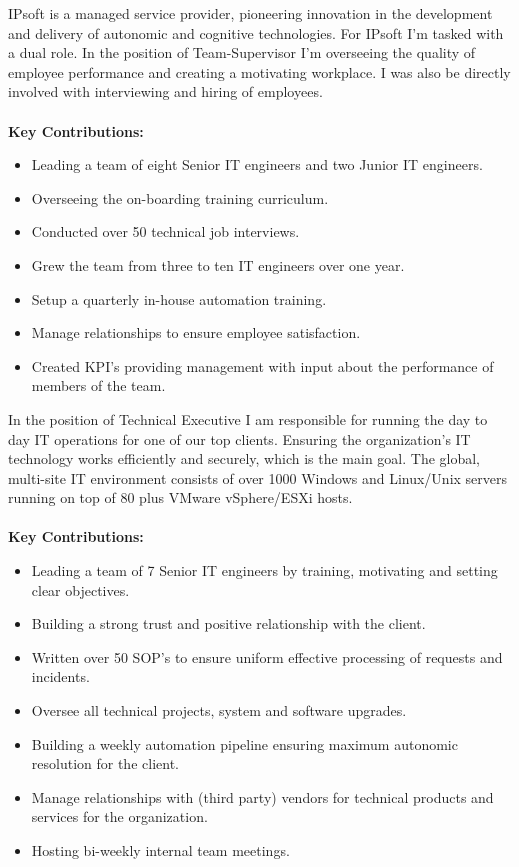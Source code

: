 \vspace{2pt}
IPsoft is a managed service provider, pioneering innovation in the development and delivery of autonomic and cognitive technologies. For IPsoft I'm tasked with a dual role. In the position of Team-Supervisor I'm overseeing the quality of employee performance and creating a motivating workplace. I was also be directly involved with interviewing and hiring of employees.\\
\\
\textbf{Key Contributions:}
\begin{itemize}
\item Leading a team of eight Senior IT engineers and two Junior IT engineers.
\item Overseeing the on-boarding training curriculum. 
\item Conducted over 50 technical job interviews.
\item Grew the team from three to ten IT engineers over one year.
\item Setup a quarterly in-house automation training. 
\item Manage relationships to ensure employee satisfaction.
\item Created KPI's providing management with input about the performance of members of the team. \\
\end{itemize}
In the position of Technical Executive I am responsible for running the day to day IT operations for one of our top clients. Ensuring the organization’s IT technology works efficiently and securely, which is the main goal. The global, multi-site IT environment consists of over 1000 Windows and Linux/Unix servers running on top of 80 plus VMware vSphere/ESXi hosts.\\ 
\\
\textbf{Key Contributions:}
\begin{itemize}
\item Leading a team of 7 Senior IT engineers by training, motivating and setting clear objectives.
\item Building a strong trust and positive relationship with the client. 
\item Written over 50 SOP's to ensure uniform effective processing of requests and incidents.
\item Oversee all technical projects, system and software upgrades. 
\item Building a weekly automation pipeline ensuring maximum autonomic resolution for the client. 
\item Manage relationships with (third party) vendors for technical products and services for the organization.
\item Hosting bi-weekly internal team meetings.
\end{itemize}

